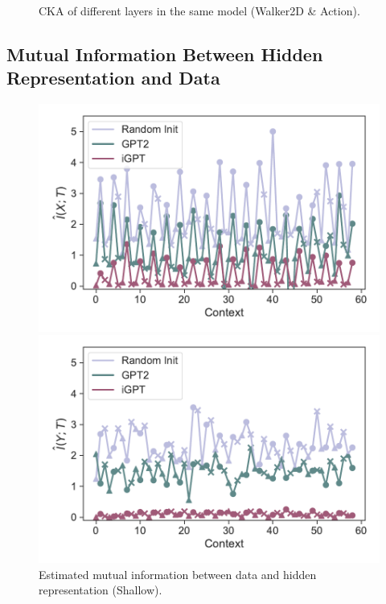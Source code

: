 \documentclass{article}
\begin{document}
\begin{figure}[H]
\begin{minipage}[b]{0.32\linewidth}
    \end{minipage}
    \caption{CKA of different layers in the same model (Walker2D \& Action).}
\end{figure}


\subsection{Mutual Information Between Hidden Representation and Data}
\label{appendix:results-for-other-conditions-mutual-information}

\begin{figure}[H]
    \centering
    \begin{minipage}[b]{0.45\linewidth}
    \includegraphics[width=\linewidth]{figs/mi_x_0.mlp.dropout_40_gpt2_igpt_dt_hopper_medium_666.pdf}
    \end{minipage}
    \begin{minipage}[b]{0.45\linewidth}
    \includegraphics[width=\linewidth]{figs/mi_y_0.mlp.dropout_40_gpt2_igpt_dt_hopper_medium_666.pdf}
    \end{minipage}
    \caption{Estimated mutual information between data and hidden representation (Shallow).}
    \label{fig:mutual_information_context_shallow}
\end{figure}
\end{document}
